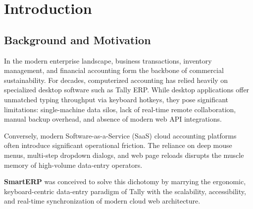 \chapter{Introduction}

\section{Background and Motivation}
In the modern enterprise landscape, business transactions, inventory management, and financial accounting form the backbone of commercial sustainability. For decades, computerized accounting has relied heavily on specialized desktop software such as Tally ERP. While desktop applications offer unmatched typing throughput via keyboard hotkeys, they pose significant limitations: single-machine data silos, lack of real-time remote collaboration, manual backup overhead, and absence of modern web API integrations.

Conversely, modern Software-as-a-Service (SaaS) cloud accounting platforms often introduce significant operational friction. The reliance on deep mouse menus, multi-step dropdown dialogs, and web page reloads disrupts the muscle memory of high-volume data-entry operators. 

\textbf{SmartERP} was conceived to solve this dichotomy by marrying the ergonomic, keyboard-centric data-entry paradigm of Tally with the scalability, accessibility, and real-time synchronization of modern cloud web architecture.

